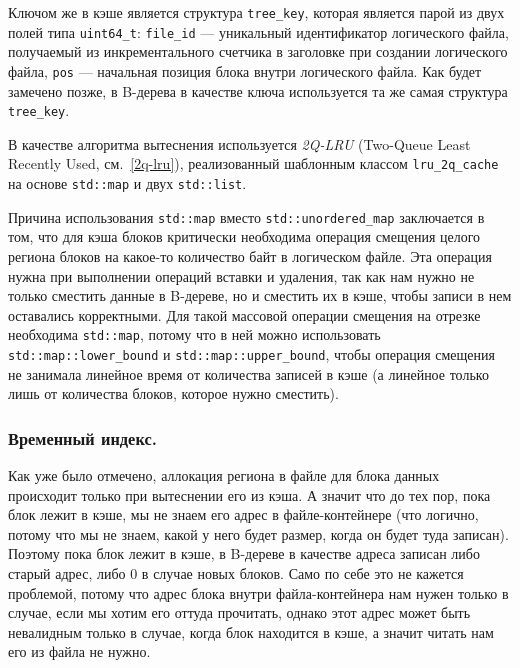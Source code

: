 Ключом же в кэше является структура \texttt{tree\_key}, которая является парой из двух полей типа \texttt{uint64\_t}: \texttt{file\_id} --- уникальный идентификатор логического файла, получаемый из инкрементального счетчика в заголовке при создании логического файла, \texttt{pos} --- начальная позиция блока внутри логического файла. Как будет замечено позже, в B-дерева в качестве ключа используется та же самая структура \texttt{tree\_key}.

В качестве алгоритма вытеснения используется \textit{2Q-LRU} (Two-Queue Least Recently Used, см.~\ref{2q-lru}), реализованный шаблонным классом \texttt{lru\_2q\_cache} на основе \texttt{std::map} и двух \texttt{std::list}. 

Причина использования \texttt{std::map} вместо \texttt{std::unordered\_map} заключается в том, что для кэша блоков критически необходима операция смещения целого региона блоков на какое-то количество байт в логическом файле. Эта операция нужна при выполнении операций вставки и удаления, так как нам нужно не только сместить данные в B-дереве, но и сместить их в кэше, чтобы записи в нем оставались корректными. Для такой массовой операции смещения на отрезке необходима \texttt{std::map}, потому что в ней можно использовать \texttt{std::map::lower\_bound} и \texttt{std::map::upper\_bound}, чтобы операция смещения не занимала линейное время от количества записей в кэше (а линейное только лишь от количества блоков, которое нужно сместить).

\subsubsection{Временный индекс.}
Как уже было отмечено, аллокация региона в файле для блока данных происходит только при вытеснении его из кэша. А значит что до тех пор, пока блок лежит в кэше, мы не знаем его адрес в файле-контейнере (что логично, потому что мы не знаем, какой у него будет размер, когда он будет туда записан). Поэтому пока блок лежит в кэше, в B-дереве в качестве адреса записан либо старый адрес, либо 0 в случае новых блоков. Само по себе это не кажется проблемой, потому что адрес блока внутри файла-контейнера нам нужен только в случае, если мы хотим его оттуда прочитать, однако этот адрес может быть невалидным только в случае, когда блок находится в кэше, а значит читать нам его из файла не нужно.

